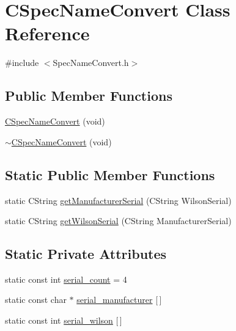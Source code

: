 \hypertarget{classCSpecNameConvert}{
\section{CSpecNameConvert Class Reference}
\label{classCSpecNameConvert}
}


{\ttfamily \#include $<$SpecNameConvert.h$>$}

\subsection*{Public Member Functions}
\begin{DoxyCompactItemize}
\item 
\hyperlink{classCSpecNameConvert_aede2d4311c7c08c6b0bcabcae724d880}{CSpecNameConvert} (void)
\item 
\hyperlink{classCSpecNameConvert_aa9437f44451765ac5481633dfc73776e}{$\sim$CSpecNameConvert} (void)
\end{DoxyCompactItemize}
\subsection*{Static Public Member Functions}
\begin{DoxyCompactItemize}
\item 
static CString \hyperlink{classCSpecNameConvert_a7bbd8bb38dda23dfb56bc2ad0ea43461}{getManufacturerSerial} (CString WilsonSerial)
\item 
static CString \hyperlink{classCSpecNameConvert_a068a6e4d274bf5f44898bf5246638997}{getWilsonSerial} (CString ManufacturerSerial)
\end{DoxyCompactItemize}
\subsection*{Static Private Attributes}
\begin{DoxyCompactItemize}
\item 
static const int \hyperlink{classCSpecNameConvert_a3824bd6a72d471ae882e39f746956480}{serial\_\-count} = 4
\item 
static const char $\ast$ \hyperlink{classCSpecNameConvert_a436a72b60b45a1d1a6f7fbe51b776ede}{serial\_\-manufacturer} \mbox{[}$\,$\mbox{]}
\item 
static const int \hyperlink{classCSpecNameConvert_a4625186edfb4c8c6f3978e39c1080b1c}{serial\_\-wilson} \mbox{[}$\,$\mbox{]}
\end{DoxyCompactItemize}


